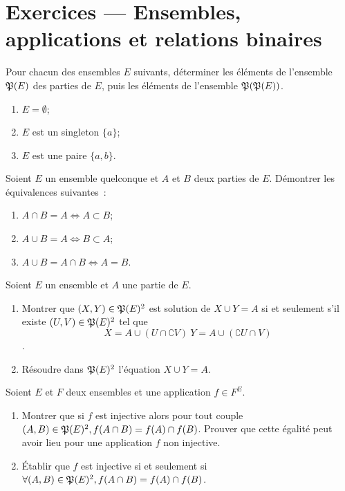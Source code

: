 \section{Exercices --- Ensembles, applications et relations binaires}
\begin{exercice}
    Pour chacun des ensembles \(E\) suivants, déterminer les éléments de l'ensemble \(\Part(E)\) des parties de \(E\), puis les éléments de l'ensemble \(\mathfrak{P}(\mathfrak{P}(E))\).
    \begin{enumerate}
        \item \(E=\emptyset\);
        \item \(E\) est un singleton \(\{a\}\);
        \item \(E\) est une paire \(\{a, b\}\).
    \end{enumerate}
\end{exercice}
\begin{exercice}
    Soient \(E\) un ensemble quelconque et \(A\) et \(B\) deux parties de \(E\). Démontrer les équivalences suivantes~:
    \begin{enumerate}
        \item \(A \cap B = A \iff A \subset B \);
        \item \(A \cup B = A \iff B \subset A \);
        \item \(A \cup B = A \cap B \iff A = B \).
    \end{enumerate}
\end{exercice}
\begin{exercice}[Résolution dans \(\Part(E)\) des équations \(X \cup Y=A\) et \(X \cap Y=A\)]
    Soient \(E\) un ensemble et \(A\) une partie de \(E\).
    \begin{enumerate}
        \item Montrer que \((X,Y)\in\mathfrak{P}(E)^2\) est solution de \(X \cup Y=A\) si et seulement s'il existe \((U, V) \in \mathfrak{P}(E)^2\) tel que \[X=A\cup(U\cap \complement V) \ Y=A\cup(\complement U \cap V)\].
        \item Résoudre dans \(\mathfrak{P}(E)^2\) l'équation \(X \cup Y = A\).
    \end{enumerate}
\end{exercice}
\begin{exercice}
    Soient \(E\) et \(F\) deux ensembles et une application \(f \in F^E\).
    \begin{enumerate}
        \item Montrer que si \(f\) est injective alors pour tout couple \((A,B) \in \mathfrak{P}(E)^2, f(A\cap B) = f(A) \cap f(B)\). Prouver que cette égalité peut avoir lieu pour une application \(f\) non injective.
        \item Établir que \(f\) est injective si et seulement si \(\forall (A,B) \in \mathfrak{P}(E)^2, f(A\cap B) = f(A) \cap f(B)\).
    \end{enumerate}
\end{exercice}
